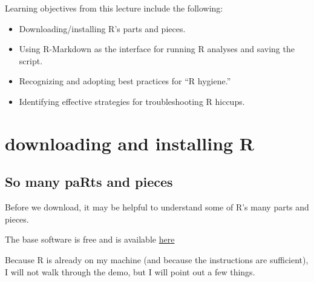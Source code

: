 \documentclass[
  english,
]{book}
\providecommand{\tightlist}{%
  \setlength{\itemsep}{0pt}\setlength{\parskip}{0pt}}
\begin{document}
Learning objectives from this lecture include the following:

\begin{itemize}
\tightlist
\item
  Downloading/installing R's parts and pieces.
\item
  Using R-Markdown as the interface for running R analyses and saving the script.
\item
  Recognizing and adopting best practices for ``R hygiene.''
\item
  Identifying effective strategies for troubleshooting R hiccups.
\end{itemize}

\hypertarget{downloading-and-installing-r}{%
\section{downloading and installing R}\label{downloading-and-installing-r}}

\hypertarget{so-many-parts-and-pieces}{%
\subsection{So many paRts and pieces}\label{so-many-parts-and-pieces}}

Before we download, it may be helpful to understand some of R's many parts and pieces.

The base software is free and is available \href{https://www.r-project.org/}{here}

Because R is already on my machine (and because the instructions are sufficient), I will not walk through the demo, but I will point out a few things.
\end{document}
